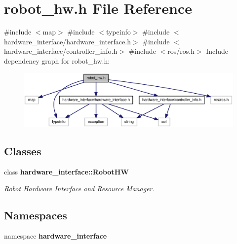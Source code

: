 \section{robot\-\_\-hw.\-h \-File \-Reference}
\label{robot__hw_8h}
{\ttfamily \#include $<$map$>$}\*
{\ttfamily \#include $<$typeinfo$>$}\*
{\ttfamily \#include $<$hardware\-\_\-interface/hardware\-\_\-interface.\-h$>$}\*
{\ttfamily \#include $<$hardware\-\_\-interface/controller\-\_\-info.\-h$>$}\*
{\ttfamily \#include $<$ros/ros.\-h$>$}\*
\-Include dependency graph for robot\-\_\-hw.\-h\-:
\nopagebreak
\begin{figure}[H]
\begin{center}
\leavevmode
\includegraphics[width=350pt]{robot__hw_8h__incl}
\end{center}
\end{figure}
\subsection*{\-Classes}
\begin{DoxyCompactItemize}
\item 
class {\bf hardware\-\_\-interface\-::\-Robot\-H\-W}
\begin{DoxyCompactList}\small\item\em \-Robot \-Hardware \-Interface and \-Resource \-Manager. \end{DoxyCompactList}\end{DoxyCompactItemize}
\subsection*{\-Namespaces}
\begin{DoxyCompactItemize}
\item 
namespace {\bf hardware\-\_\-interface}
\end{DoxyCompactItemize}
